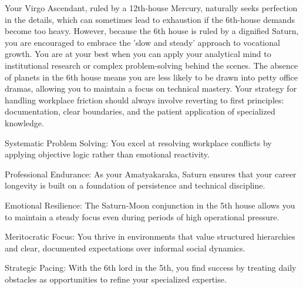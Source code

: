 {\fontsize{9}{13}\selectfont Your Virgo Ascendant, ruled by a 12th-house Mercury, naturally seeks perfection in the details, which can sometimes lead to exhaustion if the 6th-house demands become too heavy. However, because the 6th house is ruled by a dignified Saturn, you are encouraged to embrace the 'slow and steady' approach to vocational growth. You are at your best when you can apply your analytical mind to institutional research or complex problem-solving behind the scenes. The absence of planets in the 6th house means you are less likely to be drawn into petty office dramas, allowing you to maintain a focus on technical mastery. Your strategy for handling workplace friction should always involve reverting to first principles: documentation, clear boundaries, and the patient application of specialized knowledge.}\par\vspace{1.8mm}

\begin{diamondlist}
  \item {\fontsize{8.5}{12}\selectfont Systematic Problem Solving: You excel at resolving workplace conflicts by applying objective logic rather than emotional reactivity.}
  \item {\fontsize{8.5}{12}\selectfont Professional Endurance: As your Amatyakaraka, Saturn ensures that your career longevity is built on a foundation of persistence and technical discipline.}
  \item {\fontsize{8.5}{12}\selectfont Emotional Resilience: The Saturn-Moon conjunction in the 5th house allows you to maintain a steady focus even during periods of high operational pressure.}
  \item {\fontsize{8.5}{12}\selectfont Meritocratic Focus: You thrive in environments that value structured hierarchies and clear, documented expectations over informal social dynamics.}
  \item {\fontsize{8.5}{12}\selectfont Strategic Pacing: With the 6th lord in the 5th, you find success by treating daily obstacles as opportunities to refine your specialized expertise.}
\end{diamondlist}


\label{topic16}

